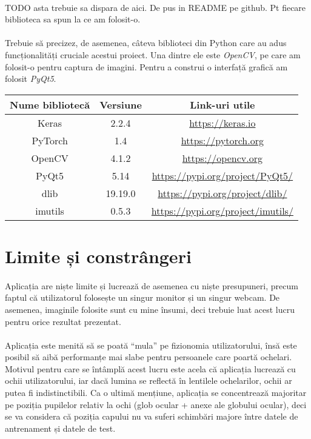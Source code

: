 \paragraph{}
TODO asta trebuie sa dispara de aici. De pus in README pe github.
Pt fiecare biblioteca sa spun la ce am folosit-o.

\paragraph{}
Trebuie să precizez, de asemenea, câteva biblioteci din Python care au adus funcționalități cruciale acestui proiect.
Una dintre ele este \emph{OpenCV}, pe care am folosit-o pentru captura de imagini.
Pentru a construi o interfață grafică am folosit \emph{PyQt5}.

\begin{center}
    \begin{tabular}{ c c c }
        Nume bibliotecă & Versiune & Link-uri utile \\
        \hline
        Keras & 2.2.4 & \url{https://keras.io} \\
        PyTorch & 1.4 & \url{https://pytorch.org} \\
        OpenCV & 4.1.2 & \url{https://opencv.org} \\
        PyQt5 & 5.14 & \url{https://pypi.org/project/PyQt5/} \\
        dlib & 19.19.0 & \url{https://pypi.org/project/dlib/} \\
        imutils & 0.5.3 & \url{https://pypi.org/project/imutils/} \\
    \end{tabular}
\end{center}

\section{Limite și constrângeri}
\paragraph{}
Aplicația are niște limite și lucrează de asemenea cu niște presupuneri, precum faptul că utilizatorul folosește un singur monitor și un singur webcam.
De asemenea, imaginile folosite sunt cu mine însumi, deci trebuie luat acest lucru pentru orice rezultat prezentat.

\paragraph{}
Aplicația este menită să se poată ``mula'' pe fizionomia utilizatorului, însă este posibil să aibă performanțe mai slabe pentru persoanele care poartă ochelari.
Motivul pentru care se întâmplă acest lucru este acela că aplicația lucrează cu ochii utilizatorului, iar dacă lumina se reflectă în lentilele ochelarilor, ochii ar putea fi indistinctibili.
Ca o ultimă mențiune, aplicația se concentrează majoritar pe poziția pupilelor relativ la ochi (glob ocular + anexe ale globului ocular), deci se va considera că poziția capului nu va suferi schimbări majore între datele de antrenament și datele de test.